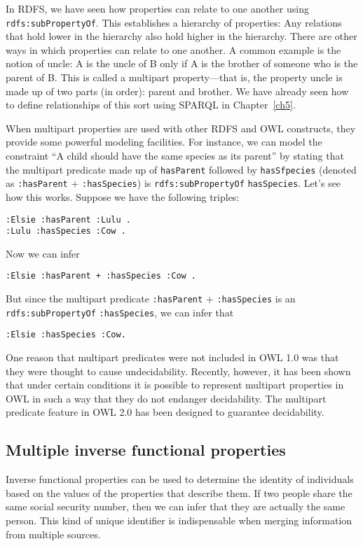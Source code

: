 In RDFS, we have seen how properties can relate to one another using
\texttt{rdfs:subPropertyOf}. This establishes a hierarchy of properties: Any
relations that hold lower in the hierarchy also hold higher in the
hierarchy. There are other ways in which properties can relate to one
another. A common example is the notion of uncle: A is the uncle of B
only if A is the brother of someone who is the parent
of B. This is called a multipart property---that is, the property uncle
is made up of two parts (in order): parent and brother. We have already
seen how to define relationships of this sort using SPARQL in Chapter~\ref{ch5}.

When multipart properties are used with other RDFS and OWL constructs,
they provide some powerful modeling facilities. For instance, we can
model the constraint ``A child should have the same species as its
parent'' by stating that the multipart predicate made up of \texttt{hasParent}
followed by \texttt{hasSfpecies} (denoted as \texttt{:hasParent} $+$ \texttt{:hasSpecies}) is
\texttt{rdfs:subPropertyOf} \texttt{hasSpecies}. Let's see how this works. Suppose we have
the following triples:

\begin{lstlisting}
:Elsie :hasParent :Lulu . 
:Lulu :hasSpecies :Cow .
\end{lstlisting}

Now we can infer

\begin{lstlisting}
:Elsie :hasParent + :hasSpecies :Cow .
\end{lstlisting}

But since the multipart predicate \texttt{:hasParent} + \texttt{:hasSpecies} is an
\texttt{rdfs:subPropertyOf}
\texttt{:hasSpecies}, we can infer that

\begin{lstlisting}
:Elsie :hasSpecies :Cow.
\end{lstlisting}

One reason that multipart predicates were not included in OWL 1.0 was
that they were thought to cause undecidability. Recently, however, it
has been shown that under certain conditions it is possible to represent
multipart properties in OWL in such a way that they do not endanger
decidability. The multipart predicate feature in OWL 2.0 has been
designed to guarantee decidability.

\subsection{Multiple inverse functional properties}
\label{mIFP}
Inverse functional properties can be used to determine the identity of
individuals based on the values of the properties that describe them. If
two people share the same social security number, then we can infer that
they are actually the same person. This kind of unique identifier is
indispensable when merging information from multiple sources.

